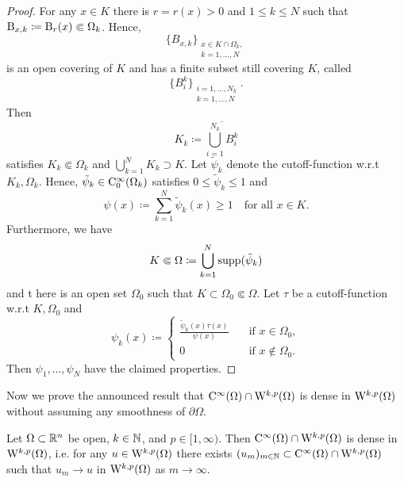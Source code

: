 \begin{proof}
  For any $x \in K$ there is $r = r(x) > 0$ and $1\leq k \leq N$ such that $\mathrm{B}_{x, k} \coloneqq \mathrm{B}_r(x) \Subset \Omega_k$.
  Hence, $$\{B_{x,k}\}_{\substack{x \in K \cap \Omega_k, \\ k = 1,\dots,N}}$$ is an open covering of $K$ and has a finite subset still covering $K$, called $$\{B_i^k\}_{\substack{i = 1,\dots,N_k \\ k = 1,\dots,N}}.$$ Then
  $$
  K_k \coloneqq \overline{\bigcup_{i = 1}^{N_k} B_i^k}
  $$
  satisfies $K_k \Subset \Omega_k$ and $\bigcup_{k = 1}^N K_k \supset K$.
  Let $\tilde \psi_k$ denote the cutoff\hyp{}function w.r.t $K_k, \Omega_k$.
  Hence, $\tilde \psi_k \in \mathrm{C}_0^\infty(\Omega_k)$ satisfies $0 \leq \tilde \psi_k \leq 1$ and
  $$
  \psi(x) \coloneqq \sum_{k = 1}^N \tilde \psi_k(x) \geq 1 \quad\text{for all } x \in K.
  $$
  Furthermore, we have
  $$
  K \Subset \Omega \coloneqq \bigcup_{k = 1}^N \operatorname{supp}(\tilde \psi_k)
  $$
  and t here is an open set $\Omega_0$ such that $K \subset \Omega_0 \Subset \Omega$.
  Let $\tau$ be a cutoff\hyp{}function w.r.t $K, \Omega_0$ and
  $$
  \psi_k(x) \coloneqq \begin{cases} \frac{\tilde \psi_k(x) \tau(x)}{\psi(x)} &\quad\text{if } x \in \Omega_0, \\ 0 &\quad \text{if } x \not\in \Omega_0. \end{cases}
  $$
  Then $\psi_1,\dots,\psi_N$ have the claimed properties.
\end{proof}

Now we prove the announced result that $\mathrm{C}^\infty(\Omega) \cap \mathrm{W}^{k,p}(\Omega)$ is dense in $\mathrm{W}^{k,p}(\Omega)$ without assuming any smoothness of $\partial \Omega$.

\begin{thm}
  \label{thm:meyersSerrin}
  Let $\Omega \subset \mathbb{R}^n$ be open, $k \in \mathbb{N}$, and $p \in [1,\infty)$.
    Then $\mathrm{C}^\infty(\Omega) \cap \mathrm{W}^{k,p}(\Omega)$ is dense in $\mathrm{W}^{k,p}(\Omega)$, i.e. for any $u \in \mathrm{W}^{k,p}(\Omega)$ there exists $(u_m)_{m \in \mathbb{N}} \subset \mathrm{C}^\infty(\Omega) \cap \mathrm{W}^{k,p}(\Omega)$ such that $u_m \to u$ in $\mathrm{W}^{k,p}(\Omega)$ as $m \to \infty$.
\end{thm}


